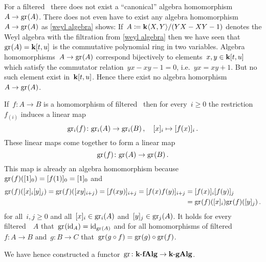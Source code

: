 \begin{warning}
  For a filtered~{\algebra{$\kf$}} there does not exist a \enquote{canonical} algebra homomorphism~$A \to \gr(A)$.
  There does not even have to exist any algebra homomorphism~$A \to \gr(A)$ as \cref{weyl algebra} shows:
  If~$A \coloneqq \mathbf{k}\langle X,Y\rangle/(YX - XY - 1)$ denotes the Weyl algebra with the filtration from \cref{weyl algebra} then we have seen that~$\gr(A) = \kf[t,u]$ is the commutative polynomial ring in two variables.
  Algebra homomorphisms~$A \to \gr(A)$ correspond bijectively to elements~$x, y \in \mathbf{k}[t,u]$ which satisfy the commutator relation~$yx - xy -1 = 0$, i.e.~$yx = xy + 1$.
  But no such element exist in~$\mathbf{k}[t,u]$.
  Hence there exist no algebra homorphism~$A \to \gr(A)$.
\end{warning}


\begin{construction}
  If~$f \colon A \to B$ is a homomorphism of filtered~{\algebras{$\kf$}} then for every~$i \geq 0$ the restriction~$f_{(i)}$ induces a linear map
  \[
    \gr[i](f)
    \colon
    \gr[i](A)
    \to
    \gr[i](B) \,,
    \quad
    [x]_i
    \mapsto
    [f(x)]_i  \,.
  \]
  These linear maps come together to form a linear map
  \[
    \gr(f)
    \colon
    \gr(A)
    \to
    \gr(B)  \,.
  \]
  This map is already an algebra homomorphism because~$\gr(f)([1]_0) = [f(1)]_0 = [1]_0$ and
  \begin{align*}
    \gr(f)( [x]_i [y]_j )
    =
    \gr(f)( [xy]_{i+j} )
    =
    [f(xy)]_{i+j}
    =
    [f(x) f(y)]_{i+j}
    &=
    [f(x)]_i [f(y)]_j
    \\
    &=
    \gr(f)([x]_i) \gr(f)([y]_j) \,.
  \end{align*}
  for all~$i, j \geq 0$ and all~$[x]_i \in \gr[i](A)$ and~$[y]_j \in \gr[j](A)$.  
  It holds for every filtered~{\algebra{$\kf$}}~$A$ that~$\gr(\id_A) = \id_{\gr(A)}$ and for all homomorphisms of filtered~{\algebras{$\kf$}}~$f \colon A \to B$ and~$g \colon B \to C$ that~$\gr(g \circ f) = \gr(g) \circ \gr(f)$.
  
  We have hence constructed a functor~$\gr \colon \cfAlg{\kf} \to \cgAlg{\kf}$.
\end{construction}



